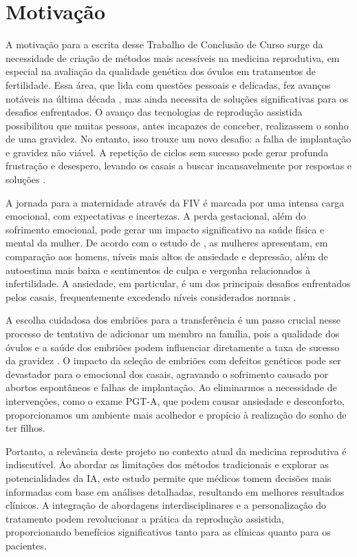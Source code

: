 \section{Motivação}

A motivação para a escrita desse Trabalho de Conclusão de Curso surge da necessidade de criação de métodos mais acessíveis na medicina reprodutiva, em especial na avaliação da qualidade genética dos óvulos em tratamentos de fertilidade. Essa área, que lida com questões pessoais e delicadas, fez avanços notáveis na última década \cite{pandit2022}, mas ainda necessita de soluções significativas para os desafios enfrentados. O avanço das tecnologias de reprodução assistida possibilitou que muitas pessoas, antes incapazes de conceber, realizassem o sonho de uma gravidez. No entanto, isso trouxe um novo desafio: a falha de implantação e gravidez não viável. A repetição de ciclos sem sucesso pode gerar profunda frustração e desespero, levando os casais a buscar incansavelmente por respostas e soluções \cite{montagnini2010}.

A jornada para a maternidade através da FIV é marcada por uma intensa carga emocional, com expectativas e incertezas. A perda gestacional, além do sofrimento emocional, pode gerar um impacto significativo na saúde física e mental da mulher. De acordo com o estudo de \cite{montagnini2010}, as mulheres apresentam, em comparação aos homens, níveis mais altos de ansiedade e depressão, além de autoestima mais baixa e sentimentos de culpa e vergonha relacionados à infertilidade. A ansiedade, em particular, é um dos principais desafios enfrentados pelos casais, frequentemente excedendo níveis considerados normais \cite{montagnini2010}.

A escolha cuidadosa dos embriões para a transferência é um passo crucial nesse processo de tentativa de adicionar um membro na família, pois a qualidade dos óvulos e a saúde dos embriões podem influenciar diretamente a taxa de sucesso da gravidez \cite{yang2024}. O impacto da seleção de embriões com defeitos genéticos pode ser devastador para o emocional dos casais, agravando o sofrimento causado por abortos espontâneos e falhas de implantação. Ao eliminarmos a necessidade de intervenções, como o exame PGT-A, que podem causar ansiedade e desconforto, proporcionamos um ambiente mais acolhedor e propício à realização do sonho de ter filhos.

Portanto, a relevância deste projeto no contexto atual da medicina reprodutiva é indiscutível. Ao abordar as limitações dos métodos tradicionais e explorar as potencialidades da IA, este estudo permite que médicos tomem decisões mais informadas com base em análises detalhadas, resultando em melhores resultados clínicos. A integração de abordagens interdisciplinares e a personalização do tratamento podem revolucionar a prática da reprodução assistida, proporcionando benefícios significativos tanto para as clínicas quanto para os pacientes.


